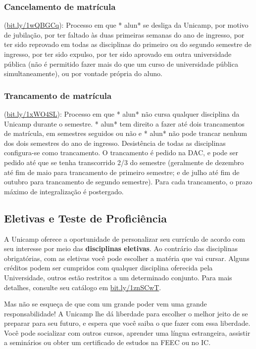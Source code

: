 \subsubsection{Cancelamento de matrícula} (\url{bit.ly/1wQBGCq}): Processo em
que * alun* se desliga da Unicamp, por motivo de jubilação, por ter faltado às
duas primeiras semanas do ano de ingresso, por ter sido reprovado em todas as
disciplinas do primeiro ou do segundo semestre de ingresso, por ter sido
expulso, por ter sido aprovado em outra universidade pública (não é permitido
fazer mais do que um curso de universidade pública simultaneamente), ou por
vontade própria do aluno.
\subsubsection{Trancamento de matrícula} (\url{bit.ly/1xWO4SL}): Processo em que
* alun* não cursa qualquer disciplina da Unicamp durante o semestre. * alun* tem
direito a fazer até dois trancamentos de matrícula, em semestres seguidos ou não
e * alun* não pode trancar nenhum dos dois semestres do ano de
ingresso. Desistência de todas as disciplinas configura-se como trancamento. O
trancamento é pedido na DAC, e pode ser pedido até que se tenha transcorrido 2/3
do semestre (geralmente de dezembro até fim de maio para trancamento de primeiro
semestre; e de julho até fim de outubro para trancamento de segundo
semestre). Para cada trancamento, o prazo máximo de integralização é postergado.

\subsection{Eletivas e Teste de Proficiência}

A Unicamp oferece a oportunidade de personalizar seu currículo de acordo com seu
interesse por meio das \textbf{disciplinas eletivas}. Ao contrário das
disciplinas obrigatórias, com as eletivas você pode escolher a matéria que vai
cursar. Alguns créditos podem ser cumpridos com qualquer disciplina oferecida
pela Universidade, outros estão restritos a um determinado conjunto. Para mais
detalhes, consulte seu catálogo em \url{bit.ly/1znSCwT}.

Mas não se esqueça de que com um grande poder vem uma grande responsabilidade!
A Unicamp lhe dá liberdade para escolher o melhor jeito de se preparar para seu
futuro, e espera que você saiba o que fazer com essa liberdade. Você pode
socializar com outros cursos, aprender uma língua estrangeira, assistir a
seminários ou obter um certificado de estudos na FEEC ou no IC.

